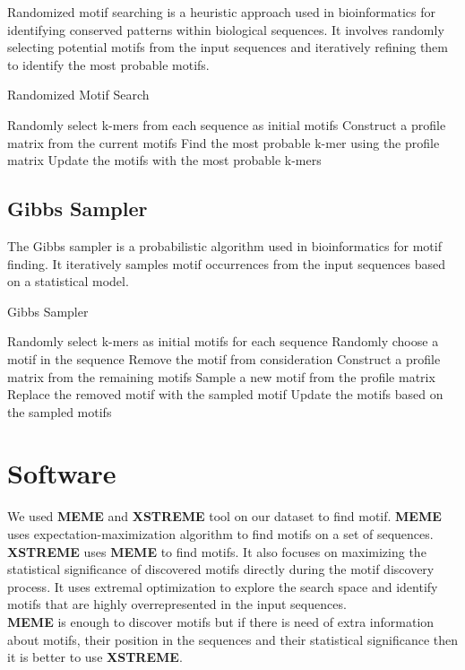\documentclass{article}
\begin{document}
Randomized motif searching is a heuristic approach used in bioinformatics for identifying conserved patterns within biological sequences. It involves randomly selecting potential motifs from the input sequences and iteratively refining them to identify the most probable motifs.
\begin{algorithm}
\caption{Randomized Motif Search}
\begin{algorithmic}[1]
\State Randomly select k-mers from each sequence as initial motifs
\Repeat
    \State Construct a profile matrix from the current motifs
        \State Find the most probable k-mer using the profile matrix
    \EndFor
    \State Update the motifs with the most probable k-mers
\end{algorithmic}
\end{algorithm}

\subsection{Gibbs Sampler}


The Gibbs sampler is a probabilistic algorithm used in bioinformatics for motif finding. It iteratively samples motif occurrences from the input sequences based on a statistical model.
\begin{algorithm}
\caption{Gibbs Sampler}
\begin{algorithmic}[1]
\State Randomly select k-mers as initial motifs for each sequence
\Repeat
        \State Randomly choose a motif in the sequence
        \State Remove the motif from consideration
        \State Construct a profile matrix from the remaining motifs
        \State Sample a new motif from the profile matrix
        \State Replace the removed motif with the sampled motif
    \EndFor
    \State Update the motifs based on the sampled motifs
\end{algorithmic}
\end{algorithm}

\section{Software}
We used \textbf{MEME} and \textbf{XSTREME} tool on our dataset to find motif. \textbf{MEME} uses expectation-maximization algorithm to find motifs on a set of sequences. \textbf{XSTREME} uses \textbf{MEME} to find motifs. It also focuses on maximizing the statistical significance of discovered motifs directly during the motif discovery process. It uses extremal optimization to explore the search space and identify motifs that are highly overrepresented in the input sequences.\\
\textbf{MEME} is enough to discover motifs but if there is need of extra information about motifs, their position in the sequences and their statistical significance then it is better to use \textbf{XSTREME}.
\end{document}
